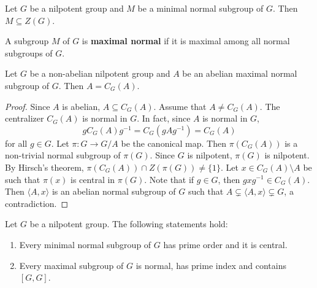 \begin{exercise}
\label{xca:nilpotente_minimalnormal}
	Let $G$ be a nilpotent group and $M$ be a minimal normal subgroup of $G$. 
	Then $M\subseteq Z(G)$.
\end{exercise}


A subgroup $M$ of $G$ is \textbf{maximal normal} if it is maximal
among all normal subgroups of $G$.  

\begin{corollary}
	Let $G$ be a non-abelian nilpotent group and $A$ be an abelian 
	maximal normal subgroup of $G$. Then $A=C_G(A)$.
\end{corollary}

\begin{proof}
	Since $A$ is abelian, $A\subseteq C_G(A)$. Assume that $A\ne C_G(A)$.
	The centralizer $C_G(A)$ is normal in $G$. In fact, since $A$ is normal in $G$, 
	\[
		gC_G(A)g^{-1}=C_G(gAg^{-1})=C_G(A)
	\]
	for all $g\in G$.  Let $\pi\colon G\to G/A$ be the canonical map.
	Then $\pi(C_G(A))$ is a non-trivial normal subgroup of $\pi(G)$. Since 
	$G$ is nilpotent, $\pi(G)$ is nilpotent. By Hirsch's theorem, 
	$\pi(C_G(A))\cap Z(\pi(G))\ne\{1\}$. Let
	$x\in C_G(A)\setminus A$ be such that $\pi(x)$ is central in $\pi(G)$. 
	Note that if $g\in G$, then $gxg^{-1}\in C_G(A)$. 
	Then 
	$\langle A,x\rangle$ is an abelian normal subgroup of $G$ such that   
	$A\subsetneq \langle
	A,x\rangle\subsetneq G$, a contradiction. 
\end{proof}

\begin{theorem}
	Let $G$ be a nilpotent group. The following statements hold:
	\begin{enumerate}
		\item Every minimal normal subgroup of $G$ has prime order and it is central. 
		\item Every maximal subgroup of $G$ is normal, has prime index and contains $[G,G]$. 
	\end{enumerate}
\end{theorem}

